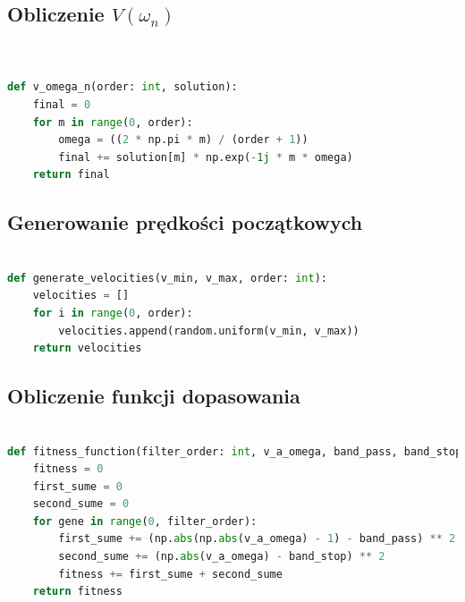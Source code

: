 \documentclass[eng, pl, oneside, openright, final, openbib]{mgr}\DeclareUnicodeCharacter{0301}{\'{e}}
\begin{document}
\subsection{Obliczenie $ V(\omega_{n})$}
\begin{lstlisting}[language=Python, caption=Implementacja równania Obliczenie $ V(\omega_{n})$]


def v_omega_n(order: int, solution):
    final = 0
    for m in range(0, order):
        omega = ((2 * np.pi * m) / (order + 1))
        final += solution[m] * np.exp(-1j * m * omega)
    return final
\end{lstlisting}
\subsection{Generowanie prędkości początkowych}
\begin{lstlisting}[language=Python, caption=Implementacja funkcji generuącej prędkośi dla każdej cząsteczki]

def generate_velocities(v_min, v_max, order: int):
    velocities = []
    for i in range(0, order):
        velocities.append(random.uniform(v_min, v_max))
    return velocities
\end{lstlisting}
\subsection{Obliczenie funkcji dopasowania}
\begin{lstlisting}[language=Python, caption=Implementacja funkcji klasyfikującej rozwiązanie]

def fitness_function(filter_order: int, v_a_omega, band_pass, band_stop):
    fitness = 0
    first_sume = 0
    second_sume = 0
    for gene in range(0, filter_order):
        first_sume += (np.abs(np.abs(v_a_omega) - 1) - band_pass) ** 2
        second_sume += (np.abs(v_a_omega) - band_stop) ** 2
        fitness += first_sume + second_sume
    return fitness
\end{lstlisting}
\end{document}
